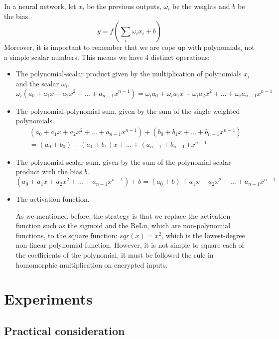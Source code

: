 \documentclass[A4paper,12pt]{article}
\begin{document}
In a neural network, let $x_i$ be the previous outputs, $\omega_i$ be the weights and $b$ be
the bias. 
\begin{equation*}
	y = f \left ( \sum_{i} \omega_i x_i + b \right )
\end{equation*}
Moreover, it is important to remember that we are cope up with polynomials, not a simple scalar numbers. This means we have 4 distinct operations: 
\begin{itemize}
	\item The polynomial-scalar product given by the multiplication of polynomials $x_i$ and the scalar $\omega_i$.
\begin{equation*}
	\omega_i(a_0 + a_1x + a_2x^2 + ... + a_{n-1}x^{n-1}) = \omega_ia_0 + \omega_ia_1x + \omega_ia_2x^2 + ... + \omega_ia_{n-1}x^{n-1}
\end{equation*}
	\item The polynomial-polynomial sum, given by the sum of the single weighted polynomials.
\begin{equation*}
	\begin{aligned}	
	(a_0 + a_1x + a_2x^2 + ... + a_{n-1}x^{n-1}) + (b_0 + b_1x + ... + b_{n-1}x^{n-1})  \\
	= (a_0 + b_0) + (a_1 + b_1)x + ... + (a_{n-1} + b_{n-1})x^{n-1}
	\end{aligned}
\end{equation*}
	\item The polynomial-scalar sum, given by the sum of the polynomial-scalar product with the bias $b$.
\begin{equation*}
	(a_0 + a_1x + a_2x^2 + ... + a_{n-1}x^{n-1}) + b = (a_0 + b) + a_1x + a_2x^2 + ... + a_{n-1}x^{n-1}
\end{equation*}
	\item The activation function.
	
	As we mentioned before, the strategy is that we replace the activation function such as the sigmoid and the ReLu, which are non-polynomial functions, to the square function: $sqr(x) = x^2$, which is the lowest-degree non-linear polynomial function. However, it is not simple to square each of the coefficients of the polynomial, it must be followed the rule in homomorphic multiplication on encrypted inputs.
\end{itemize} 

\section{Experiments}
\subsection{Practical consideration}
\end{document}

